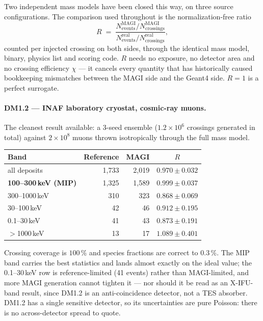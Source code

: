 \documentclass[11pt,a4paper]{article}
\begin{document}
Two independent mass models have been closed this way, on three source
configurations. The comparison used throughout is the normalization-free ratio
\[
R \;=\;
\frac{N^{\mathrm{MAGI}}_{\mathrm{events}} / N^{\mathrm{MAGI}}_{\mathrm{crossings}}}
     {N^{\mathrm{real}}_{\mathrm{events}} / N^{\mathrm{real}}_{\mathrm{crossings}}},
\]
counted per injected crossing on both sides, through the identical mass model,
binary, physics list and scoring code. $R$ needs no exposure, no detector
area and no crossing efficiency $\chi$ --- it cancels every quantity that has
historically caused bookkeeping mismatches between the MAGI side and the
Geant4 side. $R=1$ is a perfect surrogate.

\paragraph{DM1.2 --- INAF laboratory cryostat, cosmic-ray muons.} The cleanest
result available: a 3-seed ensemble ($1.2\times10^6$ crossings generated in
total) against $2\times10^8$ muons thrown isotropically through the full mass
model.

\begin{center}
\begin{tabular}{@{}lrrc@{}}
\toprule
\textbf{Band} & \textbf{Reference} & \textbf{MAGI} & \textbf{$R$} \\
\midrule
all deposits                 & 1,733 & 2,019 & $0.970 \pm 0.032$ \\
\textbf{100--300\,keV (MIP)} & 1,325 & 1,589 & $\mathbf{0.999 \pm 0.037}$ \\
300--1000\,keV               & 310   & 323   & $0.868 \pm 0.069$ \\
30--100\,keV                 & 42    & 46    & $0.912 \pm 0.195$ \\
0.1--30\,keV                 & 41    & 43    & $0.873 \pm 0.191$ \\
$>$1000\,keV                 & 13    & 17    & $1.089 \pm 0.401$ \\
\bottomrule
\end{tabular}
\end{center}

Crossing coverage is $100\,\%$ and species fractions are correct to $0.3\,\%$.
The MIP band carries the best statistics and lands almost exactly on the ideal
value; the 0.1--30\,keV row is reference-limited (41 events) rather than
MAGI-limited, and more MAGI generation cannot tighten it --- nor should it be
read as an X-IFU-band result, since DM1.2 is an anti-coincidence detector, not
a TES absorber. DM1.2 has a single sensitive detector, so its uncertainties are
pure Poisson: there is no across-detector spread to quote.
\end{document}
